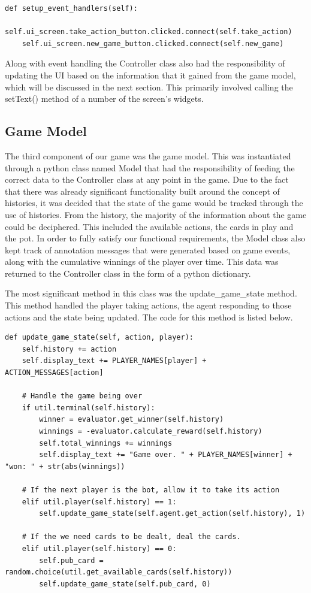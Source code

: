 \begin{lstlisting}[style=Python]
def setup_event_handlers(self):
    self.ui_screen.take_action_button.clicked.connect(self.take_action)
    self.ui_screen.new_game_button.clicked.connect(self.new_game)
\end{lstlisting}

Along with event handling the Controller class also had the responsibility of updating the
UI based on the information that it gained from the game model, which will be discussed in the next section.
This primarily involved calling the setText() method of a number of the screen's widgets.

\subsection{Game Model}\label{subsec:gameModel}
The third component of our game was the game model.
This was instantiated through a python class named Model that had the responsibility of feeding
the correct data to the Controller class at any point in the game.
Due to the fact that there was already significant functionality built around the concept of histories,
it was decided that the state of the game would be tracked through the use of histories.
From the history, the majority of the information about the game could be deciphered.
This included the available actions, the cards in play and the pot.
In order to fully satisfy our functional requirements, the Model class also kept track of annotation messages
that were generated based on game events, along with the cumulative winnings of the player over time.
This data was returned to the Controller class in the
form of a python dictionary.

The most significant method in this class was the update\_game\_state method.
This method handled the player taking actions, the agent responding to those actions and the state being
updated.
The code for this method is listed below.

\begin{lstlisting}[style=Python]
def update_game_state(self, action, player):
    self.history += action
    self.display_text += PLAYER_NAMES[player] + ACTION_MESSAGES[action]

    # Handle the game being over
    if util.terminal(self.history):
        winner = evaluator.get_winner(self.history)
        winnings = -evaluator.calculate_reward(self.history)
        self.total_winnings += winnings
        self.display_text += "Game over. " + PLAYER_NAMES[winner] + "won: " + str(abs(winnings))

    # If the next player is the bot, allow it to take its action
    elif util.player(self.history) == 1:
        self.update_game_state(self.agent.get_action(self.history), 1)

    # If the we need cards to be dealt, deal the cards.
    elif util.player(self.history) == 0:
        self.pub_card = random.choice(util.get_available_cards(self.history))
        self.update_game_state(self.pub_card, 0)
\end{lstlisting}

